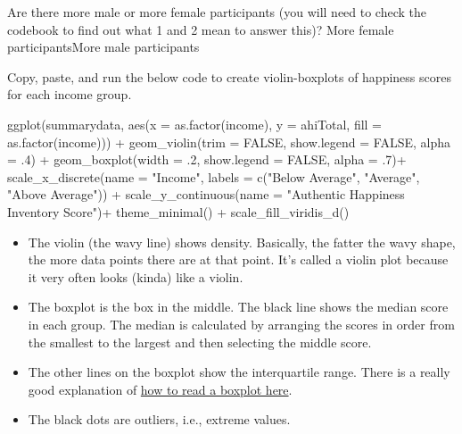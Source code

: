 \documentclass[
  oneside]{book}
\newenvironment{Shaded}{\begin{snugshade}}{\end{snugshade}}
\newcommand{\AttributeTok}[1]{\textcolor[rgb]{0.77,0.63,0.00}{#1}}
\newcommand{\ConstantTok}[1]{\textcolor[rgb]{0.00,0.00,0.00}{#1}}
\newcommand{\DecValTok}[1]{\textcolor[rgb]{0.00,0.00,0.81}{#1}}
\newcommand{\FunctionTok}[1]{\textcolor[rgb]{0.00,0.00,0.00}{#1}}
\newcommand{\NormalTok}[1]{#1}
\newcommand{\SpecialCharTok}[1]{\textcolor[rgb]{0.00,0.00,0.00}{#1}}
\newcommand{\StringTok}[1]{\textcolor[rgb]{0.31,0.60,0.02}{#1}}
\providecommand{\tightlist}{%
  \setlength{\itemsep}{0pt}\setlength{\parskip}{0pt}}
\begin{document}
Are there more male or more female participants (you will need to check the codebook to find out what 1 and 2 mean to answer this)? More female participantsMore male participants

Copy, paste, and run the below code to create violin-boxplots of happiness scores for each income group.

\begin{Shaded}
\begin{Highlighting}[]
\FunctionTok{ggplot}\NormalTok{(summarydata, }\FunctionTok{aes}\NormalTok{(}\AttributeTok{x =} \FunctionTok{as.factor}\NormalTok{(income), }\AttributeTok{y =}\NormalTok{ ahiTotal, }\AttributeTok{fill =} \FunctionTok{as.factor}\NormalTok{(income))) }\SpecialCharTok{+}
  \FunctionTok{geom\_violin}\NormalTok{(}\AttributeTok{trim =} \ConstantTok{FALSE}\NormalTok{, }\AttributeTok{show.legend =} \ConstantTok{FALSE}\NormalTok{, }\AttributeTok{alpha =}\NormalTok{ .}\DecValTok{4}\NormalTok{) }\SpecialCharTok{+}
  \FunctionTok{geom\_boxplot}\NormalTok{(}\AttributeTok{width =}\NormalTok{ .}\DecValTok{2}\NormalTok{, }\AttributeTok{show.legend =} \ConstantTok{FALSE}\NormalTok{, }\AttributeTok{alpha =}\NormalTok{ .}\DecValTok{7}\NormalTok{)}\SpecialCharTok{+}
  \FunctionTok{scale\_x\_discrete}\NormalTok{(}\AttributeTok{name =} \StringTok{"Income"}\NormalTok{, }\AttributeTok{labels =} \FunctionTok{c}\NormalTok{(}\StringTok{"Below Average"}\NormalTok{, }\StringTok{"Average"}\NormalTok{, }\StringTok{"Above Average"}\NormalTok{)) }\SpecialCharTok{+}
  \FunctionTok{scale\_y\_continuous}\NormalTok{(}\AttributeTok{name =} \StringTok{"Authentic Happiness Inventory Score"}\NormalTok{)}\SpecialCharTok{+}
  \FunctionTok{theme\_minimal}\NormalTok{() }\SpecialCharTok{+}
  \FunctionTok{scale\_fill\_viridis\_d}\NormalTok{()}
\end{Highlighting}
\end{Shaded}

\begin{itemize}
\tightlist
\item
  The violin (the wavy line) shows density. Basically, the fatter the wavy shape, the more data points there are at that point. It's called a violin plot because it very often looks (kinda) like a violin.
\item
  The boxplot is the box in the middle. The black line shows the median score in each group. The median is calculated by arranging the scores in order from the smallest to the largest and then selecting the middle score.
\item
  The other lines on the boxplot show the interquartile range. There is a really good explanation of \href{https://medium.com/dayem-siddiqui/understanding-and-interpreting-box-plots-d07aab9d1b6c}{how to read a boxplot here}.
\item
  The black dots are outliers, i.e., extreme values.
\end{itemize}
\end{document}
